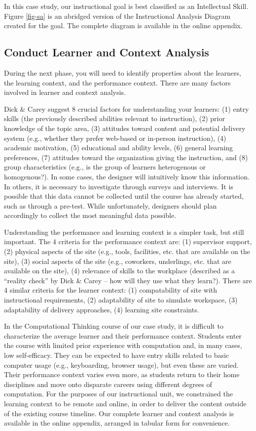 \documentclass{sig-alternate}
\begin{document}
In this case study, our instructional goal is best classified as an Intellectual Skill.
Figure \ref{fig-sa} is an abridged version of the Instructional Analysis Diagram created for the goal.
The complete diagram is available in the online appendix.

\subsection{Conduct Learner and Context Analysis}

During the next phase, you will need to identify properties about the learners, the learning context, and the performance context. 
There are many factors involved in learner and context analysis.

Dick \& Carey suggest 8 crucial factors for understanding your learners: (1) entry skills (the previously described abilities relevant to instruction), (2) prior knowledge of the topic 
area, (3) attitudes toward content and potential delivery system (e.g., whether they prefer web-based or in-person instruction), (4) academic motivation, (5) educational and ability levels, (6) general learning preferences, (7) attitudes toward the organization giving the instruction, and (8) group characteristics (e.g., is the group of learners heterogenous or homogenous?).
In some cases, the designer will intuitively know this information.
In others, it is necessary to investigate through surveys and interviews.
It is possible that this data cannot be collected until the course has already started, such as through a pre-test.
While unfortunately, designers should plan accordingly to collect the most meaningful data possible.

Understanding the performance and learning context is a simpler task, but still important.
The 4 criteria for the performance context are: (1) supervisor support, (2) physical aspects of the site (e.g., tools, facilities, etc. that are available on the site), (3) social aspects of the site (e.g., coworkers, underlings, etc. that are available on the site), (4) relevance of skills to the workplace (described as a ``reality check'' by Dick \& Carey -- how will they use what they learn?). 
There are 4 similar criteria for the learner context: (1) compatability of site with instructional requirements, (2) adaptability of site to simulate workspace, (3) adaptability of delivery approaches, (4) learning site constraints.

In the Computational Thinking course of our case study, it is difficult to characterize the average learner and their performance context.
Students enter the course with limited prior experience with computation and, in many cases, low self-efficacy.
They can be expected to have entry skills related to basic computer usage (e.g., keyboarding, browser usage), but even these are varied.
Their performance context varies even more, as students return to their home disciplines and move onto disparate careers using different degrees of computation.
For the purposes of our instructional unit, we constrained the learning context to be remote and online, in order to deliver the content outside of the existing course timeline.
Our complete learner and context analysis is available in the online appendix, arranged in tabular form for convenience.
\end{document}
